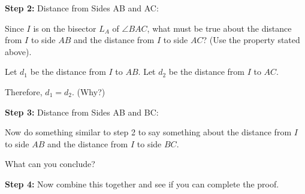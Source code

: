 \documentclass[fleqn]{article}
\theoremstyle{definition}
\begin{document}
\begin{enumerate}
\textbf{Step 2:} Distance from Sides AB and AC: 

\vspace{.25cm}
Since $I$ is on the bisector $L_A$ of $\angle BAC$, what must be true about the distance from $I$ to side $AB$ and the distance from $I$ to side $AC$? (Use the property stated above).

\vspace{.25cm}
Let $d_1$ be the distance from $I$ to $AB$. Let $d_2$ be the distance from $I$ to $AC$.

\vspace{.25cm}
Therefore, $d_1 = d_2$. (Why?)

\vspace{1cm}
\textbf{Step 3:} Distance from Sides AB and BC: 

\vspace{.25cm}
Now do something similar to step 2 to say something about the distance from $I$ to side $AB$ and the distance from $I$ to side $BC$. 

\vspace{.25cm}
What can you conclude?

\vspace{1cm}
\textbf{Step 4:} Now combine this together and see if you can complete the proof.


\end{enumerate}
\end{document}
